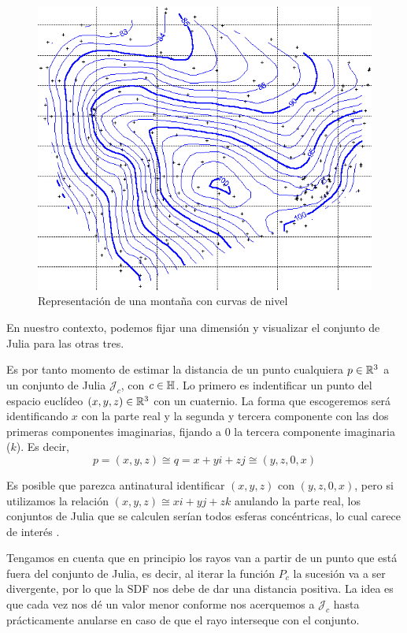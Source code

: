 \begin{figure} [ht]
    \centering
    \includegraphics[scale = 0.3]{img/C9/curvas-de-nivel2.png}
    \caption{Representación de una montaña con curvas de nivel}
    \label{fig:curva-de-nivel}
\end{figure}

En nuestro contexto, podemos fijar una dimensión y visualizar el conjunto de Julia para las otras tres. 

Es por tanto momento de estimar la distancia de un punto cualquiera $p\in\mathbb{R}^3$ a un conjunto de Julia $\mathcal{J}_c$, con $c\in\mathbb{H}$. Lo primero es indentificar un punto del espacio euclídeo $(x,y,z)\in\mathbb{R}^3$ con un cuaternio. La forma que escogeremos será identificando $x$ con la parte real y la segunda y tercera componente con las dos primeras componentes imaginarias, fijando a $0$ la tercera componente imaginaria ($k$). Es decir,
\begin{equation}
    p=(x,y,z)\cong q = x + yi + zj \cong (y,z,0,x)
\end{equation}

Es posible que parezca antinatural identificar $(x,y,z)$ con $(y,z,0,x)$, pero si utilizamos la relación $(x,y,z)\cong xi+yj+zk$ anulando la parte real, los conjuntos de Julia que se calculen serían todos esferas concéntricas, lo cual carece de interés \cite[Sección 2.3]{Hart-1989}.

Tengamos en cuenta que en principio los rayos van a partir de un punto que está fuera del conjunto de Julia, es decir, al iterar la función $P_c$ la sucesión va a ser divergente, por lo que la SDF nos debe de dar una distancia positiva. La idea es que cada vez nos dé un valor menor conforme nos acerquemos a $\mathcal{J}_c$ hasta prácticamente anularse en caso de que el rayo interseque con el conjunto. 

